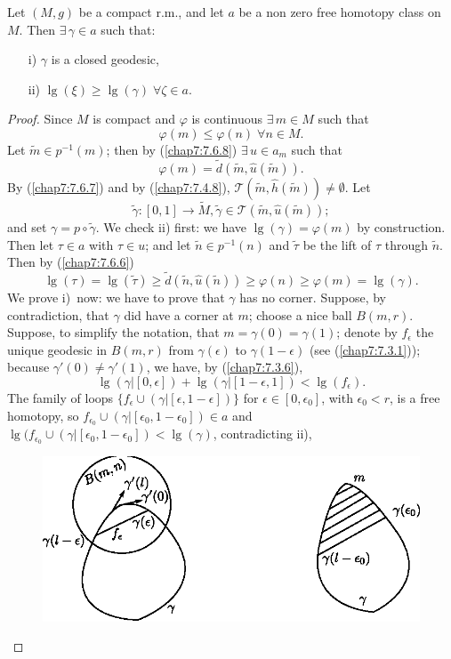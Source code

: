 \begin{theorem*}
Let $(M,g)$ be a compact r.m., and let $a$ be a non zero free homotopy
class on $M$. Then $\exists\, \gamma\in a$ such that:
\begin{itemize}
\item[\rm i)] $\gamma$ is a closed geodesic,

\item[\rm ii)] $\lg(\xi)\geq \lg(\gamma) \; \forall \zeta\in a$.
\end{itemize}
\end{theorem*}

\begin{proof}
Since $M$ is compact and $\varphi$ is continuous $\exists\, m\in M$
such that
$$
\varphi(m)\leq \varphi(n) \; \forall n\in M.
$$
Let $\widetilde{m}\in p^{-1}(m)$; then by (\ref{chap7:7.6.8}) $\exists\,
u\in a_{m}$ such that
$$
\varphi(m)=\widetilde{d}(\widetilde{m},\widehat{u}(\widetilde{m})).
$$
By (\ref{chap7:7.6.7}) and by (\ref{chap7:7.4.8}),
$\mathscr{T}(\widetilde{m},\widehat{h}(\widetilde{m}))\neq
\emptyset$. Let
$$
\widetilde{\gamma}:[0,1]\to \widetilde{M}, \widetilde{\gamma}\in
\mathscr{T}(\widetilde{m},\widehat{u}(\widetilde{m}));
$$
and set $\gamma=p\circ \widetilde{\gamma}$. We check ii) first: we
have $\lg(\gamma)=\varphi(m)$ by construction. Then let $\tau\in a$
with $\tau\in u$; and let $\widetilde{n}\in p^{-1}(n)$ and
$\widetilde{\tau}$ be the lift of $\tau$ through $\widetilde{n}$. Then
by (\ref{chap7:7.6.6})
$$
\lg(\tau)=\lg(\widetilde{\tau})\geq
\widetilde{d}(\widetilde{n},\widehat{u}(\widetilde{n}))\geq
\varphi(n)\geq \varphi(m)=\lg(\gamma). 
$$
We prove i)~now: we have to prove that $\gamma$ has no
corner. Suppose, by contradiction, that $\gamma$ did have a corner at
$m$; choose a nice ball $B(m,r)$. Suppose, to simplify the notation,
that $m=\gamma(0)=\gamma(1)$; denote by $f_{\epsilon}$ the unique
geodesic in $B(m,r)$ from $\gamma(\epsilon)$ to $\gamma(1-\epsilon)$
(see (\ref{chap7:7.3.1})); because $\gamma'(0)\neq \gamma'(1)$, we have,
by (\ref{chap7:7.3.6}),
$$
\lg(\gamma|[0,\epsilon])+\lg(\gamma|[1-\epsilon,1])<\lg(f_{\epsilon}).
$$
The family of loops $\{f_{\epsilon}\cup
(\gamma|[\epsilon,1-\epsilon])\}$ for $\epsilon\in[0,\epsilon_{0}]$,
with $\epsilon_{0}<r$, is a free homotopy, so $f_{\epsilon_{0}}\cup
(\gamma|[\epsilon_{0},1-\epsilon_{0}])\in a$ and
$\lg(f_{\epsilon_{0}}\cup
(\gamma|[\epsilon_{0},1-\epsilon_{0}])<\lg(\gamma)$,\pageoriginale
contradicting ii),
\begin{figure}[H]
\centering
\includegraphics{figures/chap7-fig10.eps}
\end{figure}
\end{proof}

